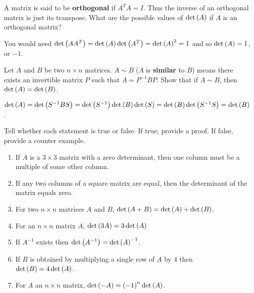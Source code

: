 \begin{enumialphparenastyle}
\begin{ex} \label{exer-orthogonal}A matrix is said to be \textbf{orthogonal}  if 
$A^{T}A=I$. Thus the inverse of an orthogonal matrix is just its transpose.
What are the possible values of $\det \left(A\right) $ if $A$ is an
orthogonal matrix? 
\begin{sol}
You would need $\det \left(AA^{T}\right) =\det
\left(A\right) \det \left(A^{T}\right) =\det \left(A\right) ^{2}=1$ and
so $\det \left(A\right) =1$, or $-1$.
\end{sol}
\end{ex}

\begin{ex} Let $A$ and $B$ be two $n\times n$ matrices. $A\sim B$
($A$ is \textbf{similar} to $B$) means there exists an invertible matrix $P$
such that $A=P^{-1}BP$. Show that if $A\sim B$, then 
$\det \left(A\right) =\det \left(B\right)$. 
\begin{sol}
$\det \left(A\right) =\det
\left(S^{-1}BS\right) =\det \left(S^{-1}\right) \det \left(B\right) \det
\left(S\right) =\det \left(B\right) \det \left(S^{-1}S\right) =\det
\left(B\right) $.
\end{sol}
\end{ex}

\begin{ex} Tell whether each statement is true or false. If true, provide a proof. If false, provide a counter example. 
\begin{enumerate}
\item If $A$ is a $3\times 3$ matrix with a zero determinant, then one
column must be a multiple of some other column.

\item If any two columns of a square matrix are equal, then the determinant
of the matrix equals zero.

\item For two $n\times n$ matrices $A$ and $B$, $\det \left(A+B\right)
=\det \left(A\right) +\det \left(B\right) $.

\item For an $n\times n$ matrix $A$, $\det \left(3A\right) =3\det \left(
A\right) $

\item If $A^{-1}$ exists then $\det \left(A^{-1}\right) =\det \left(
A\right) ^{-1}$.

\item If $B$ is obtained by multiplying a single row of $A$ by $4$ then $%
\det \tup{B} =4\det \tup{A} $.

\item For $A$ an $n\times n$ matrix, $\det \left(-A\right) =\left(
-1\right) ^{n}\det \left(A\right) $.


\end{enumerate}
\end{ex}
\end{enumialphparenastyle}
